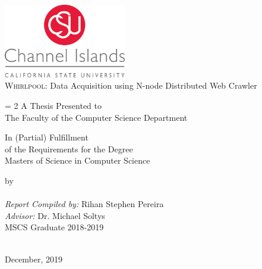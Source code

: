 \begin{titlepage}
\begin{center}
\includegraphics[width=0.40\textwidth]{../media/correctlogo.jpg}~\\[1cm]


{\large {\textsc{Whirlpool:} Data Acquisition using N-node Distributed Web Crawler}}\\[0.5cm]

\vspace{0.5 cm}

\baselineskip = 2\baselineskip
A Thesis Presented to \\
The Faculty of the Computer Science Department

\vspace{0.5 cm}

In (Partial) Fulfillment\\
of the Requirements for the Degree\\
Masters of Science in Computer Science\\

\vspace{0.5 cm }


by \\

\HRule \\[1.5cm]
{\textit{Report Compiled by:} {Rihan Stephen Pereira}}\\[0.1cm]
{\textit{Advisor:} {Dr. Michael Soltys}}\\[0.1cm]
{\small {MSCS Graduate 2018-2019}}\\[0.1cm]
\HRule \\[1.5cm]


\vfill

{\large December, 2019}
\end{center}
\end{titlepage}

